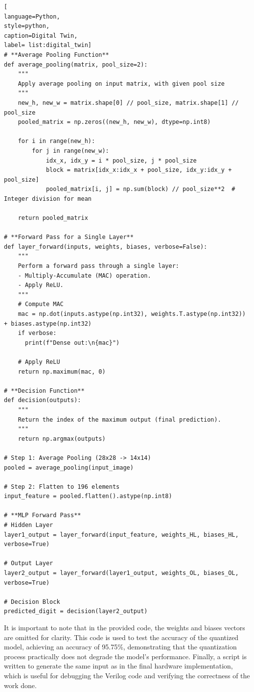 \documentclass[11pt]{report}
\begin{document}
\begin{lstlisting}[
language=Python,
style=python,
caption=Digital Twin,
label= list:digital_twin]
# **Average Pooling Function**
def average_pooling(matrix, pool_size=2):
    """
    Apply average pooling on input matrix, with given pool size
    """
    new_h, new_w = matrix.shape[0] // pool_size, matrix.shape[1] // pool_size
    pooled_matrix = np.zeros((new_h, new_w), dtype=np.int8)

    for i in range(new_h):
        for j in range(new_w):
            idx_x, idx_y = i * pool_size, j * pool_size
            block = matrix[idx_x:idx_x + pool_size, idx_y:idx_y + pool_size]
            pooled_matrix[i, j] = np.sum(block) // pool_size**2  # Integer division for mean

    return pooled_matrix

# **Forward Pass for a Single Layer**
def layer_forward(inputs, weights, biases, verbose=False):
    """
    Perform a forward pass through a single layer:
    - Multiply-Accumulate (MAC) operation.
    - Apply ReLU.
    """
    # Compute MAC
    mac = np.dot(inputs.astype(np.int32), weights.T.astype(np.int32)) + biases.astype(np.int32)
    if verbose:
      print(f"Dense out:\n{mac}")

    # Apply ReLU
    return np.maximum(mac, 0)

# **Decision Function**
def decision(outputs):
    """
    Return the index of the maximum output (final prediction).
    """
    return np.argmax(outputs)

# Step 1: Average Pooling (28x28 -> 14x14)
pooled = average_pooling(input_image)

# Step 2: Flatten to 196 elements
input_feature = pooled.flatten().astype(np.int8)

# **MLP Forward Pass**
# Hidden Layer
layer1_output = layer_forward(input_feature, weights_HL, biases_HL, verbose=True)

# Output Layer
layer2_output = layer_forward(layer1_output, weights_OL, biases_OL, verbose=True)

# Decision Block
predicted_digit = decision(layer2_output)
\end{lstlisting}

It is important to note that in the provided code, the weights and biases vectors are omitted for clarity. This code is used to test the accuracy of the quantized model, achieving an accuracy of 95.75\%, demonstrating that the quantization process practically does not degrade the model's performance. Finally, a script is written to generate the same input as in the final hardware implementation, which is useful for debugging the Verilog code and verifying the correctness of the work done.
\end{document}

